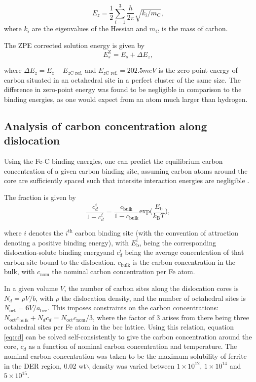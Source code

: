 \documentclass[a4paper,11pt]{article}
\begin{document}
\[ E_z = \frac{1}{2} \sum_{i=1}^3 \frac{h}{2\pi} \sqrt{ k_i /
    m_{\text{C}} },  \]
where \(k_i\) are the eigenvalues of the Hessian and \(m_\text{C}\) is
the mass of carbon. 

The ZPE corrected solution energy is given by 
\[ E^{\text{Z}}_{s} = E_s + \Delta E_z,  \]

where \(\Delta E_z = E_z - E_{z\text{C ref.}}\) and \(E_{z\text{C ref.}} = 202.5 meV\) is the zero-point energy of carbon
situated in an octahedral site in a perfect cluster of the same size. The difference in
zero-point energy was found to be negligible in comparison to the binding energies, as one would
expect from an atom much larger than hydrogen. 

\subsection{Analysis of carbon concentration along dislocation}
\label{sec:orgb7c138c}

Using the Fe-C binding energies, one can predict the equilibrium carbon concentration of a given carbon
binding site, assuming carbon atoms around the core are sufficiently spaced such that intersite
interaction energies are negligible \cite{Ventelon2015}.

The fraction is given by 
\[  \frac{ c_d^{i} }{1 -  c_d^{i} } = \frac{ c_{\text{bulk}}^{} }{1 - c_{\text{bulk}} } \text{exp} \Big( 
    \frac{E_{\text{b}} }{k_{\text{B}}T}  \Big), \]
\label{eq:cd}

where \(i\) denotes the \(i^{\text{th}}\) carbon binding site (with the convention of attraction
denoting a positive binding energy), with \(E_{\text{b}}^{i}\), being the
corresponding dislocation-solute binding energyand \(c_d^{i}\) being the average concentration of that carbon
site bound to the dislocation. \(c_{\text{bulk}}^{}\) is the carbon concentration in the bulk, with
\(c_{\text{nom}}^{}\) the nominal carbon concentration per Fe atom.


In a given volume \(V\), the number of carbon sites along the dislocation cores is \(N_d = \rho V/b\),
with \(\rho\) the dislocation density, and the number of octahedral sites is \(N_{\text{oct}} =
    6V/a_{\text{bcc}}\). This imposes constraints on the carbon concentrations: \(N_{\text{oct}}
    c_{\text{bulk}}^{} + N_d c_d = N_{\text{oct}} c_{\text{nom}}/3\), where the factor of 3 arises from there being
three octahedral sites per Fe atom in the bcc lattice. Using this relation, equation \ref{eq:cd} can be solved
self-consistently to give the carbon concentration around the core, \(c_d\) as a function of
nominal carbon concentration and temperature. The nominal carbon concentration was taken to be
the maximum solubility of ferrite in the DER region, 0.02 wt$\backslash$%
density was varied between \(1\times10^{12}\), \(1\times10^{14}\) and \(5\times10^{15}\).
\end{document}
